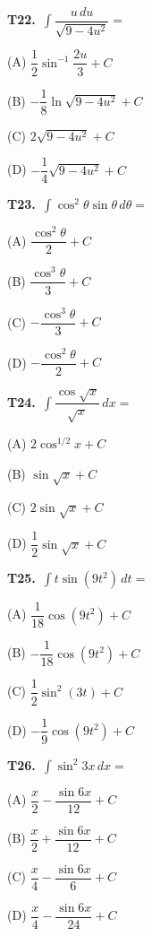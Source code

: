 \documentclass[11pt]{article}
\begin{document}
\bigskip\noindent\textbf{T22.}\ $\displaystyle\int \dfrac{u\,du}{\sqrt{9-4u^2}} =$
\begin{list}{}{\setlength{\leftmargin}{3em}\setlength{\labelwidth}{2.5em}\setlength{\itemsep}{0pt}\setlength{\topsep}{2pt}}
\item[(A)] $\dfrac{1}{2}\sin^{-1}\dfrac{2u}{3}+C$
\item[(B)] $-\dfrac{1}{8}\ln\sqrt{9-4u^2}+C$
\item[(C)] $2\sqrt{9-4u^2}+C$
\item[(D)] $-\dfrac{1}{4}\sqrt{9-4u^2}+C$
\end{list}

\bigskip\noindent\textbf{T23.}\ $\displaystyle\int \cos^2\theta\sin\theta\,d\theta =$
\begin{list}{}{\setlength{\leftmargin}{3em}\setlength{\labelwidth}{2.5em}\setlength{\itemsep}{0pt}\setlength{\topsep}{2pt}}
\item[(A)] $\dfrac{\cos^2\theta}{2}+C$
\item[(B)] $\dfrac{\cos^3\theta}{3}+C$
\item[(C)] $-\dfrac{\cos^3\theta}{3}+C$
\item[(D)] $-\dfrac{\cos^2\theta}{2}+C$
\end{list}

\bigskip\noindent\textbf{T24.}\ $\displaystyle\int \dfrac{\cos\sqrt{x}}{\sqrt{x}}\,dx =$
\begin{list}{}{\setlength{\leftmargin}{3em}\setlength{\labelwidth}{2.5em}\setlength{\itemsep}{0pt}\setlength{\topsep}{2pt}}
\item[(A)] $2\cos^{1/2}x+C$
\item[(B)] $\sin\sqrt{x}+C$
\item[(C)] $2\sin\sqrt{x}+C$
\item[(D)] $\dfrac{1}{2}\sin\sqrt{x}+C$
\end{list}

\bigskip\noindent\textbf{T25.}\ $\displaystyle\int t\sin(9t^2)\,dt =$
\begin{list}{}{\setlength{\leftmargin}{3em}\setlength{\labelwidth}{2.5em}\setlength{\itemsep}{0pt}\setlength{\topsep}{2pt}}
\item[(A)] $\dfrac{1}{18}\cos(9t^2)+C$
\item[(B)] $-\dfrac{1}{18}\cos(9t^2)+C$
\item[(C)] $\dfrac{1}{2}\sin^2(3t)+C$
\item[(D)] $-\dfrac{1}{9}\cos(9t^2)+C$
\end{list}

\bigskip\noindent\textbf{T26.}\ $\displaystyle\int \sin^2 3x\,dx =$
\begin{list}{}{\setlength{\leftmargin}{3em}\setlength{\labelwidth}{2.5em}\setlength{\itemsep}{0pt}\setlength{\topsep}{2pt}}
\item[(A)] $\dfrac{x}{2}-\dfrac{\sin 6x}{12}+C$
\item[(B)] $\dfrac{x}{2}+\dfrac{\sin 6x}{12}+C$
\item[(C)] $\dfrac{x}{4}-\dfrac{\sin 6x}{6}+C$
\item[(D)] $\dfrac{x}{4}-\dfrac{\sin 6x}{24}+C$
\end{list}
\end{document}
